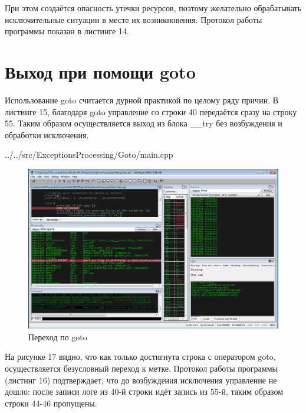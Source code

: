 \documentclass[a4paper, 12pt]{report}		%
\begin{document}
При этом создаётся опасность утечки ресурсов, поэтому желательно обрабатывать исключительные ситуации в месте их возникновения. Протокол работы программы показан в листинге 14.



\chapter*{Выход при помощи goto}

Использование goto считается дурной практикой по целому ряду причин. В листинге 15, благодаря goto управление со строки 40 передаётся сразу на строку 55. Таким образом осуществляется выход из блока \_\_try без возбуждения и обработки исключения\cite{Dushutina}.


{../../src/ExceptionsProcessing/Goto/main.cpp}

\begin{figure}[h!]
\centering
\includegraphics[scale=0.50]{res/010}
\caption{Переход по goto}
\end{figure}

На рисунке 17 видно, что как только достигнута строка с оператором goto, осуществляется безусловный переход к метке. Протокол работы программы (листинг 16) подтверждает, что до возбуждения исключения управление не дошло: после записи  логе из 40-й строки идёт запись из 55-й, таким образом строки 44-46 пропущены.
\newpage
\end{document}
